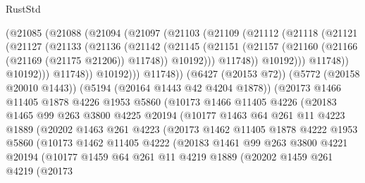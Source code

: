\begin{lexlean}{RustStd}
\begin{coremodule}
{\begin{coremodule}
{{{{{{{{{{{{{{{{{{{{{{{{{{{{{                (@21085
                  (@21088
                    (@21094
                      (@21097
                        (@21103
                          (@21109
                            (@21112
                              (@21118
                                (@21121
                                  (@21127
                                    (@21133
                                      (@21136
                                        (@21142
                                          (@21145
                                            (@21151
                                              (@21157
                                                (@21160 (@21166 (@21169 (@21175 @21206)) @11748))
                                                @10192)))
                                          @11748))
                                      @10192)))
                                @11748))
                            @10192)))
                      @11748))
                  @10192)))
            @11748))
        (@6427 (@20153 @72))
        (@5772 (@20158 @20010 @1443))
        (@5194 (@20164 @1443 @42 @4204 @1878))
        (@20173
          @1466
          @11405
          @1878
          @4226
          @1953
          @5860
          (@10173
            @1466
            @11405
            @4226
            (@20183
              @1465
              @99
              @263
              @3800
              @4225
              @20194
              (@10177
                @1463
                @64
                @261
                @11
                @4223
                @1889
                (@20202
                  @1463
                  @261
                  @4223
                  (@20173
                    @1462
                    @11405
                    @1878
                    @4222
                    @1953
                    @5860
                    (@10173
                      @1462
                      @11405
                      @4222
                      (@20183
                        @1461
                        @99
                        @263
                        @3800
                        @4221
                        @20194
                        (@10177
                          @1459
                          @64
                          @261
                          @11
                          @4219
                          @1889
                          (@20202
                            @1459
                            @261
                            @4219
                            (@20173
}}}}}}}}}}}}}}}}}}}}}}}}}}}}}
\end{coremodule}}
\end{coremodule}
\end{lexlean}
